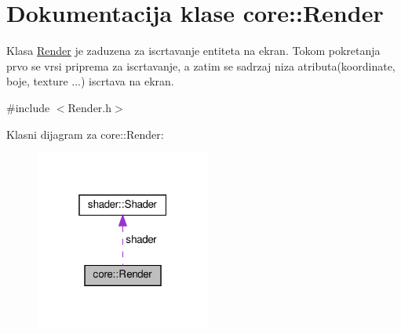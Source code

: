 \hypertarget{classcore_1_1Render}{}\section{Dokumentacija klase core\+:\+:Render}
\label{classcore_1_1Render}


Klasa \hyperlink{classcore_1_1Render}{Render} je zaduzena za iscrtavanje entiteta na ekran. Tokom pokretanja prvo se vrsi priprema za iscrtavanje, a zatim se sadrzaj niza atributa(koordinate, boje, texture ...) iscrtava na ekran.  




{\ttfamily \#include $<$Render.\+h$>$}



Klasni dijagram za core\+:\+:Render\+:
\nopagebreak
\begin{figure}[H]
\begin{center}
\leavevmode
\includegraphics[width=163pt]{classcore_1_1Render__coll__graph}
\end{center}
\end{figure}

